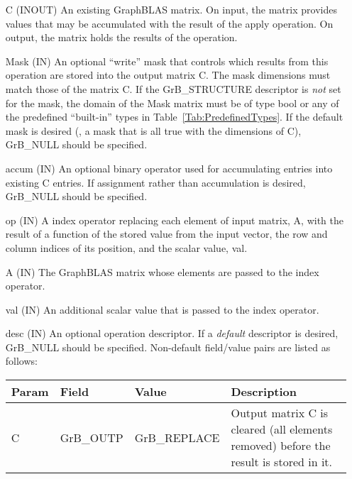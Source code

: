 \begin{itemize}[leftmargin=1.1in]
    \item[{\sf C}]    ({\sf INOUT}) An existing GraphBLAS matrix. On input,
    the matrix provides values that may be accumulated with the result of the
    apply operation.  On output, the matrix holds the results of the
    operation.

    \item[{\sf Mask}] ({\sf IN}) An optional ``write'' mask that controls which
    results from this operation are stored into the output matrix {\sf C}. The 
    mask dimensions must match those of the matrix {\sf C}. If the 
    {\sf GrB\_STRUCTURE} descriptor is {\em not} set for the mask, the domain of the 
    {\sf Mask} matrix must be of type {\sf bool} or any of the predefined 
    ``built-in'' types in Table~\ref{Tab:PredefinedTypes}.  If the default
    mask is desired (\ie, a mask that is all {\sf true} with the dimensions of {\sf C}), 
    {\sf GrB\_NULL} should be specified.

    \item[{\sf accum}] ({\sf IN}) An optional binary operator used for accumulating
    entries into existing {\sf C} entries. If assignment rather than accumulation is
    desired, {\sf GrB\_NULL} should be specified.

    \item[{\sf op}] ({\sf IN}) A index operator replacing each element of input 
    matrix, {\sf A}, with the result of a function of the stored value from the input vector, 
	the row and column indices of its position, and the scalar value, {\sf val}.

    \item[{\sf A}] ({\sf IN}) The GraphBLAS matrix whose elements are passed 
    to the index operator.

    \item[{\sf val}] ({\sf IN}) An additional scalar value that is passed to the 
	index operator.
	
    \item[{\sf desc}] ({\sf IN}) An optional operation descriptor. If
    a \emph{default} descriptor is desired, {\sf GrB\_NULL} should be
    specified. Non-default field/value pairs are listed as follows:  \\

    \hspace*{-2em}\begin{tabular}{lllp{2.7in}}
        Param & Field  & Value & Description \\
        \hline
        {\sf C}    & {\sf GrB\_OUTP} & {\sf GrB\_REPLACE} & Output matrix {\sf C}
        is cleared (all elements removed) before the result is stored in it.\\


\end{tabular}
\end{itemize}
